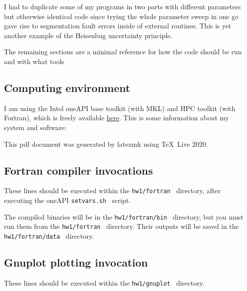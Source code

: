 \documentclass{article}
\begin{document}
I had to duplicate some of my programs in two parts with
different parameters but otherwise identical code since 
trying the whole parameter sweep in one go gave rise to
segmentation fault errors inside of external routines.
This is yet another example of the Heisenbug uncertainty principle.

The remaining sections are a minimal reference for how the code
should be run and with what tools

\subsection{
Computing environment
}

I am using the Intel oneAPI base toolkit (with MKL)
and HPC toolkit (with Fortran), which is freely available
\href{https://software.intel.com/content/www/us/en/develop/
articles/free-intel-software-developer-tools.html}{here}.
This is some information about my system and software:



This pdf document was generated by latexmk using \TeX\ Live 2020.

\subsection{
Fortran compiler invocations
}

These lines should be executed within the {\tt hw1/fortran }
directory, after executing the oneAPI {\tt setvars.sh } script.



The compiled binaries will be in the {\tt hw1/fortran/bin }
directory, but you must run them from the {\tt hw1/fortran } directory.
Their outputs will be saved in the {\tt hw1/fortran/data } directory.

\subsection{
Gnuplot plotting invocation
}

These lines should be executed within the {\tt hw1/gnuplot }
directory.


\end{document}
